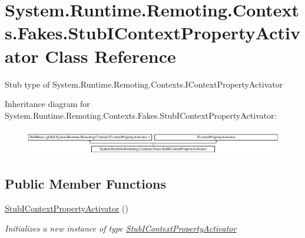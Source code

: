 \hypertarget{class_system_1_1_runtime_1_1_remoting_1_1_contexts_1_1_fakes_1_1_stub_i_context_property_activator}{\section{System.\-Runtime.\-Remoting.\-Contexts.\-Fakes.\-Stub\-I\-Context\-Property\-Activator Class Reference}
\label{class_system_1_1_runtime_1_1_remoting_1_1_contexts_1_1_fakes_1_1_stub_i_context_property_activator}
}


Stub type of System.\-Runtime.\-Remoting.\-Contexts.\-I\-Context\-Property\-Activator 


Inheritance diagram for System.\-Runtime.\-Remoting.\-Contexts.\-Fakes.\-Stub\-I\-Context\-Property\-Activator\-:\begin{figure}[H]
\begin{center}
\leavevmode
\includegraphics[height=1.169102cm]{class_system_1_1_runtime_1_1_remoting_1_1_contexts_1_1_fakes_1_1_stub_i_context_property_activator}
\end{center}
\end{figure}
\subsection*{Public Member Functions}
\begin{DoxyCompactItemize}
\item 
\hyperlink{class_system_1_1_runtime_1_1_remoting_1_1_contexts_1_1_fakes_1_1_stub_i_context_property_activator_a9f3e895081902d20b1a773f959500733}{Stub\-I\-Context\-Property\-Activator} ()
\begin{DoxyCompactList}\small\item\em Initializes a new instance of type \hyperlink{class_system_1_1_runtime_1_1_remoting_1_1_contexts_1_1_fakes_1_1_stub_i_context_property_activator}{Stub\-I\-Context\-Property\-Activator}\end{DoxyCompactList}\end{DoxyCompactItemize}
